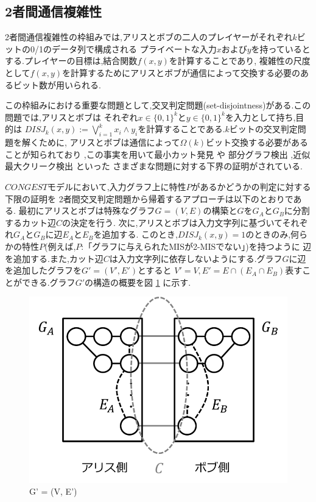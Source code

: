 \documentclass[12]{thesis}
\theoremstyle{definition}
\begin{document}
\subsection*{2者間通信複雑性}
2者間通信複雑性の枠組みでは,アリスとボブの二人のプレイヤーがそれぞれ$k$ビットの0/1のデータ列で構成される
プライベートな入力$x$および$y$を持っているとする.プレイヤーの目標は,結合関数$f(x, y)$を計算することであり,
複雑性の尺度として$f(x, y)$を計算するためにアリスとボブが通信によって交換する必要のあるビット数が用いられる.

この枠組みにおける重要な問題として,交叉判定問題(set-disjointness)がある.この問題では,アリスとボブは
それぞれ$x \in \{0, 1\}^{k}$と$y \in \{0, 1\}^{k}$を入力として持ち,目的は
$DISJ_{k} (x, y) :=\bigvee_{i = 1}^{k} x_{i} \land y_{i}$を計算することである.$k$ビットの交叉判定問題を解くために,
アリスとボブは通信によって$\Omega (k)$ビット交換する必要があることが知られており 
\cite{kalyanasundaram1992probabilistic},この事実を用いて最小カット発見 \cite{ghaffari2013distributed} や
部分グラフ検出 \cite{fischer2018possibilities} ,近似最大クリーク検出 \cite{czumaj2020detecting} といった
さまざまな問題に対する下界の証明がされている.

$CONGEST$モデルにおいて,入力グラフ上に特性$P$があるかどうかの判定に対する下限の証明を
2者間交叉判定問題から帰着するアプローチは以下のとおりである.
最初にアリスとボブは特殊なグラフ$G = (V, E)$の構築と$G$を$G_{A}$と$G_{B}$に分割するカット辺$C$の決定を行う.
次に,アリスとボブは入力文字列に基づいてそれぞれ$G_{A}$と$G_{B}$に辺$E_{A}$と$E_{B}$を追加する.
このとき,$DISJ_{k} (x, y)=1$のときのみ,何らかの特性$P$(例えば,$P$:「グラフに与えられたMISが2-MISでない」)を持つように
辺を追加する.また,カット辺$C$は入力文字列に依存しないようにする.グラフ$G$に辺を追加したグラフを$G' = (V', E')$とすると
$V' = V, E' = E \cap (E_{A} \cap E_{B})$表すことができる.グラフ$G'$の構造の概要を図 \ref{Dif_Gx} に示す.

\begin{figure}[ht]
\begin{center}
\includegraphics[width=120mm]{Dif_Gx.png}
\end{center}
\caption{G' = (V, E')}
\label{Dif_Gx}
\end{figure}
\end{document}
